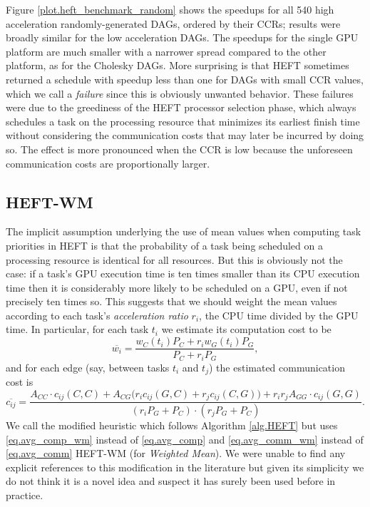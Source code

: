 \documentclass[runningheads]{llncs}
\begin{document}
Figure \ref{plot.heft_benchmark_random} shows the speedups for all 540 high acceleration randomly-generated DAGs, ordered by their CCRs; results were broadly similar for the low acceleration DAGs. The speedups for the single GPU platform are much smaller with a narrower spread compared to the other platform, as for the Cholesky DAGs. More surprising is that HEFT sometimes returned a schedule with speedup less than one for DAGs with small CCR values, which we call a {\em failure} since this is obviously unwanted behavior. These failures were due to the greediness of the HEFT processor selection phase, which always schedules a task on the processing resource that minimizes its earliest finish time without considering the communication costs that may later be incurred by doing so. The effect is more pronounced when the CCR is low because the unforeseen communication costs are proportionally larger. 


\subsection{HEFT-WM}
\label{subsect.heft_WM}

The implicit assumption underlying the use of mean values when computing task priorities in HEFT is that the probability of a task being scheduled on a processing resource is identical for all resources. But this is obviously not the case: if a task's GPU execution time is ten times smaller than its CPU execution time then it is considerably more likely to be scheduled on a GPU, even if not precisely ten times so. This suggests that we should weight the mean values according to each task's {\em acceleration ratio} $r_i$, the CPU time divided by the GPU time. In particular, for each task $t_i$ we estimate its computation cost to be
\begin{equation}
\label{eq.avg_comp_wm}
\overline{w_i} = \frac{w_C(t_i) P_C + r_iw_G(t_i) P_G}{P_C + r_iP_G},
\end{equation}  
and for each edge (say, between tasks $t_i$ and $t_j$) the estimated communication cost is
\begin{equation}
\label{eq.avg_comm_wm}
\overline{c_{ij}} = \frac{A_{CC} \cdot c_{ij}(C, C) + A_{CG}\big(r_ic_{ij}(G, C) + r_jc_{ij}(C, G)\big) + r_ir_j A_{GG} \cdot c_{ij}(G, G) }{(r_iP_G + P_C) \cdot (r_jP_G + P_C)}. 
\end{equation}
We call the modified heuristic which follows Algorithm \ref{alg.HEFT} but uses \eqref{eq.avg_comp_wm} instead of \eqref{eq.avg_comp} and \eqref{eq.avg_comm_wm} instead of \eqref{eq.avg_comm} HEFT-WM (for {\em Weighted Mean}). We were unable to find any explicit references to this modification in the literature but given its simplicity we do not think it is a novel idea and suspect it has surely been used before in practice.  
\end{document}
